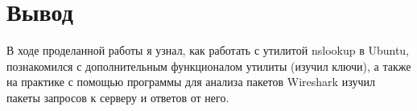 \chapter{Вывод}
\label{ch:chap3}

В ходе проделанной работы я узнал, как работать с утилитой nslookup в Ubuntu, познакомился с дополнительным функционалом 
утилиты (изучил ключи), а также на практике с помощью программы для анализа пакетов Wireshark изучил пакеты запросов к серверу
и ответов от него.